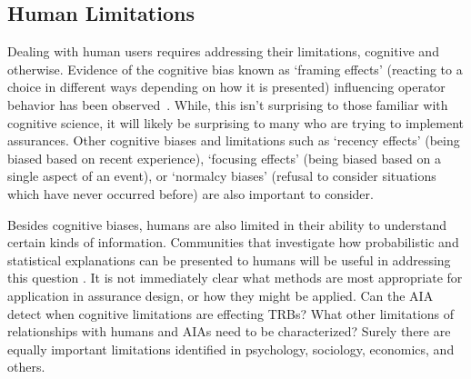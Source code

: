 \subsection{Human Limitations}
Dealing with human users requires addressing their limitations, cognitive and otherwise. Evidence of the cognitive bias known as  `framing effects' (reacting to a choice in different ways depending on how it is presented) influencing operator behavior has been observed~\cite{Freedy2007-sg,Riley1996-qm}. While, this isn't surprising to those familiar with cognitive science, it will likely be surprising to many who are trying to implement assurances. Other cognitive biases and limitations such as `recency effects' (being biased based on recent experience), `focusing effects' (being biased based on a single aspect of an event), or `normalcy biases' (refusal to consider situations which have never occurred before) are also important to consider. 

Besides cognitive biases, humans are also limited in their ability to understand certain kinds of information. Communities that investigate how probabilistic and statistical explanations can be presented to humans will be useful in addressing this question \cite{Rouse1986-dz,Wallace2001-fm,Kuhn1997-qc,Lomas2012-ie,Swartout1983-ko}. It is not immediately clear what methods are most appropriate for application in assurance design, or how they might be applied. Can the AIA detect when cognitive limitations are effecting TRBs? What other limitations of relationships with humans and AIAs need to be characterized? Surely there are equally important limitations identified in psychology, sociology, economics, and others.



